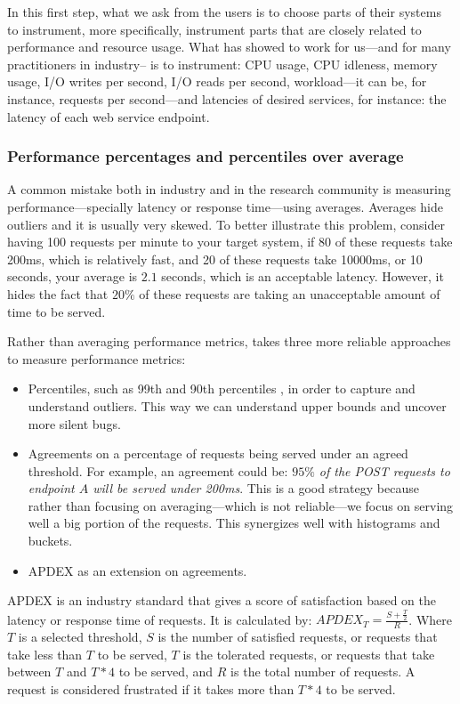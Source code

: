 In this first step, what we ask from the users is to choose parts of their systems to instrument, more specifically, instrument parts that are closely related to performance and resource usage. What has showed to work for us---and for many practitioners in industry-- is to instrument: CPU usage, CPU idleness, memory usage, I/O writes per second, I/O reads per second, workload---it can be, for instance, requests per second---and latencies of desired services, for instance: the latency of each web service endpoint.

\subsubsection{Performance percentages and percentiles over average}

A common mistake both in industry and in the research community is measuring performance---specially latency or response time---using averages. Averages hide outliers and it is usually very skewed. To better illustrate this problem, consider having 100 requests per minute to your target system, if 80 of these requests take 200ms, which is relatively fast, and 20 of these requests take 10000ms, or 10 seconds, your average is $2.1$ seconds, which is an acceptable latency. However, it hides the fact that $20\%$ of these requests are taking an unacceptable amount of time to be served.

Rather than averaging performance metrics, \projectname{} takes three more reliable approaches to measure performance metrics:

\begin{itemize}
  \item Percentiles, such as 99th and 90th percentiles , in order to capture and understand outliers. This way we can understand upper bounds and uncover more silent bugs.
  \item Agreements on a percentage of requests being served under an agreed threshold. For example, an agreement could be: \textit{$95\%$ of the POST requests to endpoint $A$ will be served under 200ms}. This is a good strategy because rather than focusing on averaging---which is not reliable---we focus on serving well a big portion of the requests. This synergizes well with histograms and buckets.
  \item APDEX \cite{Apdex} as an extension on agreements.
\end{itemize}

APDEX is an industry standard that gives a score of satisfaction based on the latency or response time of requests. It is calculated by: $APDEX_T = \frac{S + \frac{T}{2}}{R}$. Where $T$ is a selected threshold, $S$ is the number of satisfied requests, or requests that take less than $T$ to be served, $T$ is the tolerated requests, or requests that take between $T$ and $T*4$ to be served, and $R$ is the total number of requests. A request is considered frustrated if it takes more than $T*4$ to be served.

